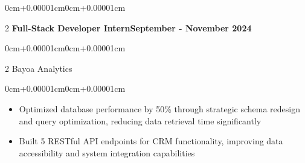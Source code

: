 \documentclass[11pt, letterpaper]{article}
\newenvironment{highlights}{\begin{itemize}[topsep=0.08cm,parsep=0.08cm,partopsep=0pt,itemsep=0pt,leftmargin=0cm+10pt]}{\end{itemize}}
\newenvironment{onecolentry}{\begin{adjustwidth}{0cm+0.00001cm}{0cm+0.00001cm}}{\end{adjustwidth}}
\newenvironment{twocolentry}[2][]{\onecolentry\def\secondColumn{#2}\setcolumnwidth{\fill,5.2cm}\begin{paracol}{2}}{\switchcolumn \raggedleft \secondColumn\end{paracol}\endonecolentry}
\begin{document}
    \begin{twocolentry}{\textbf{September - November 2024}}
    \textbf{Full-Stack Developer Intern}\end{twocolentry}
    \vspace{0.05cm}
    \begin{twocolentry}{}
    Bayoa Analytics\end{twocolentry}
    \vspace{0.10cm}
    \begin{onecolentry}
        \begin{highlights}
            \item Optimized database performance by 50\% through strategic schema redesign and query optimization, reducing data retrieval time significantly
            \item Built 5 RESTful API endpoints for CRM functionality, improving data accessibility and system integration capabilities
        \end{highlights}
    \end{onecolentry}
    \vspace{0.15cm}
\end{document}
